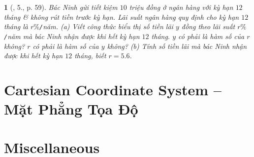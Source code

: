 \documentclass{article}
\newtheorem{baitoan}{}
\begin{document}
\begin{baitoan}[\cite{SGK_Toan_8_Canh_Dieu_tap_1}, 5., p. 59]
	Bác Ninh gửi tiết kiệm $10$ triệu đồng ở ngân hàng với kỳ hạn $12$ tháng \& không rút tiền trước kỳ hạn. Lãi suất ngân hàng quy định cho kỳ hạn $12$ tháng là $r\%${\tt/}năm. (a) Viết công thức biểu thị số tiền lãi $y$ đồng theo lãi suất $r\%${\tt/}năm mà bác Ninh nhận được khi hết kỳ hạn $12$ tháng. $y$ có phải là hàm số của $r$ không? $r$ có phải là hàm số của $y$ không? (b) Tính số tiền lãi mà bác Ninh nhận được khi hết kỳ hạn $12$ tháng, biết $r = 5.6$.
\end{baitoan}


\section{Cartesian Coordinate System -- Mặt Phẳng Tọa Độ}


\section{Miscellaneous}


\printbibliography[heading=bibintoc]
	
\end{document}
